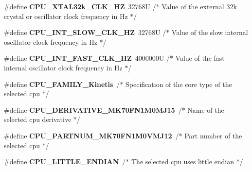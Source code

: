 \begin{DoxyCompactItemize}
\item 
\hypertarget{group___cpu__module_gab701f4ea593c322e0f7a3ee5f0572834}{}\#define {\bfseries C\+P\+U\+\_\+\+X\+T\+A\+L32k\+\_\+\+C\+L\+K\+\_\+\+H\+Z}~32768\+U /$\ast$ Value of the external 32k crystal or oscillator clock frequency in Hz $\ast$/\label{group___cpu__module_gab701f4ea593c322e0f7a3ee5f0572834}

\item 
\hypertarget{group___cpu__module_ga925e4835a9fdb52f03bd354d62d6ba0a}{}\#define {\bfseries C\+P\+U\+\_\+\+I\+N\+T\+\_\+\+S\+L\+O\+W\+\_\+\+C\+L\+K\+\_\+\+H\+Z}~32768\+U /$\ast$ Value of the slow internal oscillator clock frequency in Hz  $\ast$/\label{group___cpu__module_ga925e4835a9fdb52f03bd354d62d6ba0a}

\item 
\hypertarget{group___cpu__module_ga741ad9275688de8051f4bebd98a682bc}{}\#define {\bfseries C\+P\+U\+\_\+\+I\+N\+T\+\_\+\+F\+A\+S\+T\+\_\+\+C\+L\+K\+\_\+\+H\+Z}~4000000\+U /$\ast$ Value of the fast internal oscillator clock frequency in Hz  $\ast$/\label{group___cpu__module_ga741ad9275688de8051f4bebd98a682bc}

\item 
\hypertarget{group___cpu__module_ga5bf3022570d9bb7a0d666f2dd9db6a34}{}\#define {\bfseries C\+P\+U\+\_\+\+F\+A\+M\+I\+L\+Y\+\_\+\+Kinetis}~/$\ast$ Specification of the core type of the selected cpu $\ast$/\label{group___cpu__module_ga5bf3022570d9bb7a0d666f2dd9db6a34}

\item 
\hypertarget{group___cpu__module_gacd513a4c0c142604e0fa3fbaf5f92e42}{}\#define {\bfseries C\+P\+U\+\_\+\+D\+E\+R\+I\+V\+A\+T\+I\+V\+E\+\_\+\+M\+K70\+F\+N1\+M0\+M\+J15}~/$\ast$ Name of the selected cpu derivative $\ast$/\label{group___cpu__module_gacd513a4c0c142604e0fa3fbaf5f92e42}

\item 
\hypertarget{group___cpu__module_ga4fcc1df1d7918b17e6f8af2228b9a1c4}{}\#define {\bfseries C\+P\+U\+\_\+\+P\+A\+R\+T\+N\+U\+M\+\_\+\+M\+K70\+F\+N1\+M0\+V\+M\+J12}~/$\ast$ Part number of the selected cpu $\ast$/\label{group___cpu__module_ga4fcc1df1d7918b17e6f8af2228b9a1c4}

\item 
\hypertarget{group___cpu__module_gab62ca27d0a6a531f35842a6e3a94b454}{}\#define {\bfseries C\+P\+U\+\_\+\+L\+I\+T\+T\+L\+E\+\_\+\+E\+N\+D\+I\+A\+N}~/$\ast$ The selected cpu uses little endian $\ast$/\label{group___cpu__module_gab62ca27d0a6a531f35842a6e3a94b454}


\end{DoxyCompactItemize}
